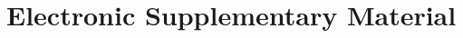 \documentclass[utf8]{FrontiersinVancouver}
\begin{document}


\section*{Electronic Supplementary Material}
\end{document}

